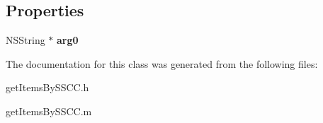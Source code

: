 \subsection*{Properties}
\begin{DoxyCompactItemize}
\item 
\hypertarget{interfaceget_items_by_s_s_c_c_a00c510462d5da3d2cbcdfc59d704e281}{}N\+S\+String $\ast$ {\bfseries arg0}\label{interfaceget_items_by_s_s_c_c_a00c510462d5da3d2cbcdfc59d704e281}

\end{DoxyCompactItemize}


The documentation for this class was generated from the following files\+:\begin{DoxyCompactItemize}
\item 
get\+Items\+By\+S\+S\+C\+C.\+h\item 
get\+Items\+By\+S\+S\+C\+C.\+m\end{DoxyCompactItemize}
